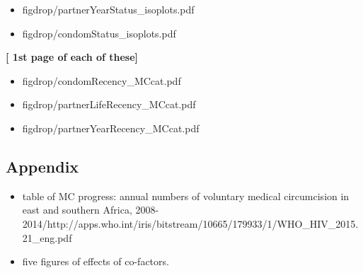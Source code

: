\documentclass[12pt,]{article}
\providecommand{\tightlist}{%
  \setlength{\itemsep}{0pt}\setlength{\parskip}{0pt}}
\begin{document}
\begin{itemize}
\tightlist
\item
  figdrop/partnerYearStatus\_isoplots.pdf
\item
  figdrop/condomStatus\_isoplots.pdf
\end{itemize}

\textbf{{[} 1st page of each of these{]}}

\begin{itemize}
\tightlist
\item
  figdrop/condomRecency\_MCcat.pdf
\item
  figdrop/partnerLifeRecency\_MCcat.pdf
\item
  figdrop/partnerYearRecency\_MCcat.pdf
\end{itemize}

\subsection{Appendix}\label{appendix-1}

\begin{itemize}
\tightlist
\item
  table of MC progress: annual numbers of voluntary medical circumcision
  in east and southern Africa,
  2008-2014/http://apps.who.int/iris/bitstream/10665/179933/1/WHO\_HIV\_2015.21\_eng.pdf
\item
  five figures of effects of co-factors.
\end{itemize}

\printbibliography
\end{document}
